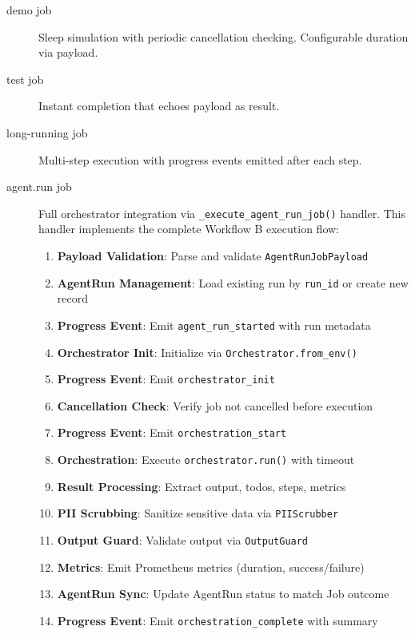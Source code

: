 \documentclass[a4paper,twoside]{sapthesis}
\begin{document}
\begin{description}
    \item[demo job] Sleep simulation with periodic cancellation checking. Configurable duration via payload.
    
    \item[test job] Instant completion that echoes payload as result.
    
    \item[long-running job] Multi-step execution with progress events emitted after each step.
    
    \item[agent.run job] Full orchestrator integration via \texttt{\_execute\_agent\_run\_job()} handler. This handler implements the complete Workflow B execution flow:
    \begin{enumerate}
        \item \textbf{Payload Validation}: Parse and validate \texttt{AgentRunJobPayload}
        \item \textbf{AgentRun Management}: Load existing run by \texttt{run\_id} or create new record
        \item \textbf{Progress Event}: Emit \texttt{agent\_run\_started} with run metadata
        \item \textbf{Orchestrator Init}: Initialize via \texttt{Orchestrator.from\_env()}
        \item \textbf{Progress Event}: Emit \texttt{orchestrator\_init}
        \item \textbf{Cancellation Check}: Verify job not cancelled before execution
        \item \textbf{Progress Event}: Emit \texttt{orchestration\_start}
        \item \textbf{Orchestration}: Execute \texttt{orchestrator.run()} with timeout
        \item \textbf{Result Processing}: Extract output, todos, steps, metrics
        \item \textbf{PII Scrubbing}: Sanitize sensitive data via \texttt{PIIScrubber}
        \item \textbf{Output Guard}: Validate output via \texttt{OutputGuard}
        \item \textbf{Metrics}: Emit Prometheus metrics (duration, success/failure)
        \item \textbf{AgentRun Sync}: Update AgentRun status to match Job outcome
        \item \textbf{Progress Event}: Emit \texttt{orchestration\_complete} with summary
    \end{enumerate}
\end{description}
\end{document}
